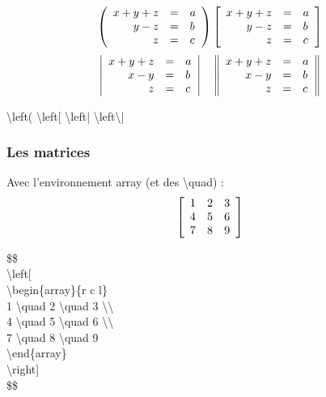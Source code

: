 \documentclass{report}
\begin{document}
$$
\left(
\begin{array}{r c l}
x + y + z &=& a\\
y - z &=& b\\
z &=& c 
\end{array}
\right)
\left[
\begin{array}{r c l}
x + y + z &=& a\\
y - z &=& b\\
z &=& c 	
\end{array}
\right]
$$
$$
\left|
\begin{array}{r c l}
x + y + z &=& a\\
x - y &=& b\\
z &=& c
\end{array}
\right|
\quad
\left\|
\begin{array}{r c l}
x + y + z &=& a\\
x - y &=& b\\
z &=& c
\end{array}
\right\|
$$
\bigskip
\begin{center}
{\selectfont \textbackslash{}left( \qquad \textbackslash{}left[ \qquad \textbackslash{}left| \qquad \textbackslash{}left\textbackslash{}| }
\end{center}

\newpage

\subsubsection*{Les matrices}

Avec l'environnement {\selectfont array}  (et des \textbackslash{}quad) :
$$
\left[
\begin{array}{r c l}
1 \quad 2 \quad 3 \\
4 \quad 5 \quad 6 \\
7 \quad 8 \quad 9
\end{array}
\right] $$

{\selectfont
\$\$ \\
\textbackslash{}left[ \\
\textbackslash{}begin\{array\}\{r c l\} \\
1 \textbackslash{}quad 2 \textbackslash{}quad 3 \textbackslash{}\textbackslash{} \\
4 \textbackslash{}quad 5 \textbackslash{}quad 6 \textbackslash{}\textbackslash{} \\
7 \textbackslash{}quad 8 \textbackslash{}quad 9 \\
\textbackslash{}end\{array\} \\
\textbackslash{}right] \\
\$\$ 
}
\end{document}
